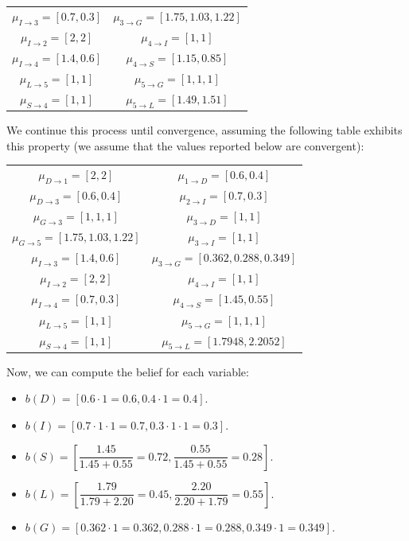 \begin{example}
\begin{table}[H]
\begin{tabular}{cc}
        $\mu_{I \rightarrow 3}=[0.7,0.3]$ & $\mu_{3 \rightarrow G}=[1.75,1.03,1.22]$ \\
        $\mu_{I \rightarrow 2}=[2,2]$ & $\mu_{4 \rightarrow I}=[1,1]$   \\
        $\mu_{I \rightarrow 4}=[1.4,0.6]$ & $\mu_{4 \rightarrow S}=[1.15,0.85]$   \\
        $\mu_{L \rightarrow 5}=[1,1]$ & $\mu_{5 \rightarrow G}=[1,1,1]$ \\
        $\mu_{S \rightarrow 4}=[1,1]$ & $\mu_{5 \rightarrow L}=[1.49,1.51]$   \\ \hline
        \end{tabular}
    \end{table}
    We continue this process until convergence, assuming the following table exhibits this property (we assume that the values reported below are convergent):
    \begin{table}[H]
        \centering
        \begin{tabular}{cc}
        \hline
        $\mu_{D \rightarrow 1}=[2,2]$ & $\mu_{1 \rightarrow D}=[0.6,0.4]$   \\
        $\mu_{D \rightarrow 3}=[0.6,0.4]$ & $\mu_{2 \rightarrow I}=[0.7,0.3]$   \\
        $\mu_{G \rightarrow 3}=[1,1,1]$ & $\mu_{3 \rightarrow D}=[1,1]$   \\
        $\mu_{G \rightarrow 5}=[1.75,1.03,1.22]$ & $\mu_{3 \rightarrow I}=[1,1]$   \\
        $\mu_{I \rightarrow 3}=[1.4,0.6]$ & $\mu_{3 \rightarrow G}=[0.362,0.288,0.349]$ \\
        $\mu_{I \rightarrow 2}=[2,2]$ & $\mu_{4 \rightarrow I}=[1,1]$   \\
        $\mu_{I \rightarrow 4}=[0.7,0.3]$ & $\mu_{4 \rightarrow S}=[1.45,0.55]$   \\
        $\mu_{L \rightarrow 5}=[1,1]$ & $\mu_{5 \rightarrow G}=[1,1,1]$ \\
        $\mu_{S \rightarrow 4}=[1,1]$ & $\mu_{5 \rightarrow L}=[1.7948,2.2052]$   \\ \hline
        \end{tabular}
    \end{table}
    Now, we can compute the belief for each variable:
    \begin{itemize}
        \item $b(D) = \left[0.6 \cdot 1 = 0.6, 0.4 \cdot 1 = 0.4\right]$.
        \item $b(I) = \left[0.7 \cdot 1 \cdot 1 = 0.7, 0.3 \cdot 1 \cdot 1 = 0.3\right]$.
        \item $b(S) = \left[\dfrac{1.45}{1.45 + 0.55}= 0.72, \dfrac{0.55}{ 1.45 + 0.55} = 0.28\right]$.
        \item $b(L)=\left[\dfrac{1.79}{1.79 + 2.20}= 0.45, \dfrac{2.20}{2.20+1.79} = 0.55\right]$.
        \item $b(G) = \left[0.362 \cdot 1 = 0.362, 0.288 \cdot 1 = 0.288, 0.349 \cdot 1 = 0.349\right]$.
    \end{itemize}
\end{example}

